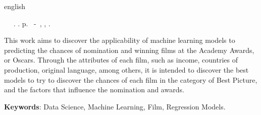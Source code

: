 \begin{resumo}[Abstract]
 \begin{otherlanguage*}{english}
	\begin{flushleft} 
		\setlength{\absparsep}{0pt} %
 		\SingleSpacing 
 		\imprimirautorabr~ ~\textbf{\imprimirtitleabstract}.	\imprimirdata.  \pageref{LastPage}p. 
		\imprimirtipotrabalho~-~\imprimirinstituicao, \imprimirlocal, 	\imprimirdata. 
 	\end{flushleft}
	\OnehalfSpacing 
   This work aims to discover the applicability of machine learning models to predicting the chances of nomination and winning films at the Academy Awards, or Oscars. Through the attributes of each film, such as income, countries of production, original language, among others, it is intended to discover the best models to try to discover the chances of each film in the category of Best Picture, and the factors that influence the nomination and awards.
 
   \vspace{\onelineskip}
 
   \noindent 
   \textbf{Keywords}: Data Science, Machine Learning, Film, Regression Models.
 \end{otherlanguage*}
\end{resumo}
